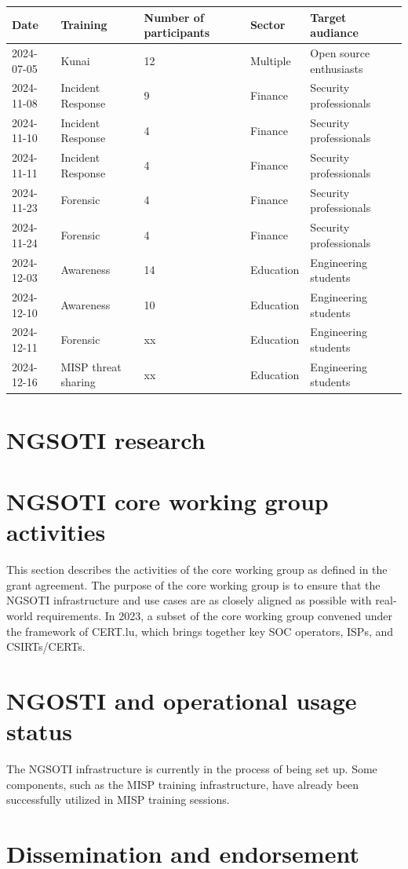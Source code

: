 \begin{table}
	\begin{tabular}{lllll}
		\hline
		Date       & Training            & Number of participants & Sector    & Target audiance         \\
		\hline
		2024-07-05 & Kunai               & 12                     & Multiple  & Open source enthusiasts \\
		2024-11-08 & Incident Response   & 9                      & Finance   & Security professionals  \\
		2024-11-10 & Incident Response   & 4                      & Finance   & Security professionals  \\
		2024-11-11 & Incident Response   & 4                      & Finance   & Security professionals  \\
		2024-11-23 & Forensic            & 4                      & Finance   & Security professionals  \\
		2024-11-24 & Forensic            & 4                      & Finance   & Security professionals  \\
  		2024-12-03 & Awareness		 & 14 			  & Education & Engineering students    \\
    		2024-12-10 & Awareness		 & 10 			  & Education & Engineering students    \\
		2024-12-11 & Forensic            & xx                     & Education & Engineering students    \\
		2024-12-16 & MISP threat sharing & xx                     & Education & Engineering students    \\
		\hline
	\end{tabular}
\end{table}

\chapter{NGSOTI research}

\chapter{NGSOTI core working group activities}
This section describes the activities of the core working group as defined in the grant agreement. The purpose of the core working group is to ensure that the NGSOTI infrastructure and use cases are as closely aligned as possible with real-world requirements. In 2023, a subset of the core working group convened under the framework of CERT.lu, which brings together key SOC operators, ISPs, and CSIRTs/CERTs.

\chapter{NGOSTI and operational usage status}

The NGSOTI infrastructure is currently in the process of being set up. Some components, such as the MISP training infrastructure, have already been successfully utilized in MISP training sessions.

\chapter{Dissemination and endorsement}

